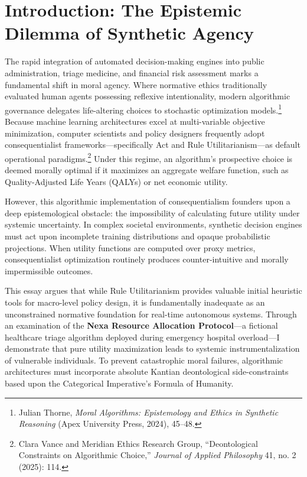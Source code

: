 \documentclass[11pt,a4paper]{article}
\begin{document}
\section{Introduction: The Epistemic Dilemma of Synthetic Agency}

The rapid integration of automated decision-making engines into public administration, triage medicine, and financial risk assessment marks a fundamental shift in moral agency. Where normative ethics traditionally evaluated human agents possessing reflexive intentionality, modern algorithmic governance delegates life-altering choices to stochastic optimization models.\footnote{Julian Thorne, \textit{Moral Algorithms: Epistemology and Ethics in Synthetic Reasoning} (Apex University Press, 2024), 45--48.} Because machine learning architectures excel at multi-variable objective minimization, computer scientists and policy designers frequently adopt consequentialist frameworks---specifically Act and Rule Utilitarianism---as default operational paradigms.\footnote{Clara Vance and Meridian Ethics Research Group, ``Deontological Constraints on Algorithmic Choice,'' \textit{Journal of Applied Philosophy} 41, no. 2 (2025): 114.} Under this regime, an algorithm's prospective choice is deemed morally optimal if it maximizes an aggregate welfare function, such as Quality-Adjusted Life Years (QALYs) or net economic utility.

However, this algorithmic implementation of consequentialism founders upon a deep epistemological obstacle: the impossibility of calculating future utility under systemic uncertainty. In complex societal environments, synthetic decision engines must act upon incomplete training distributions and opaque probabilistic projections. When utility functions are computed over proxy metrics, consequentialist optimization routinely produces counter-intuitive and morally impermissible outcomes.

This essay argues that while Rule Utilitarianism provides valuable initial heuristic tools for macro-level policy design, it is fundamentally inadequate as an unconstrained normative foundation for real-time autonomous systems. Through an examination of the \textbf{Nexa Resource Allocation Protocol}---a fictional healthcare triage algorithm deployed during emergency hospital overload---I demonstrate that pure utility maximization leads to systemic instrumentalization of vulnerable individuals. To prevent catastrophic moral failures, algorithmic architectures must incorporate absolute Kantian deontological side-constraints based upon the Categorical Imperative's Formula of Humanity.
\end{document}

